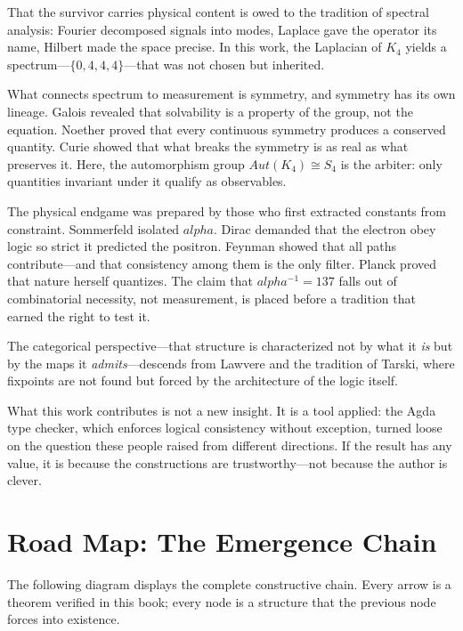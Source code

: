 \documentclass[11pt,a4paper]{book}
\def\alpha{alpha}%
\def\mathrm#1{#1}%
\begin{document}
That the survivor carries physical content is owed to the tradition of spectral analysis: Fourier decomposed signals into modes, Laplace gave the operator its name, Hilbert made the space precise. In this work, the Laplacian of $K_4$ yields a spectrum---$\{0,4,4,4\}$---that was not chosen but inherited.

What connects spectrum to measurement is symmetry, and symmetry has its own lineage. Galois revealed that solvability is a property of the group, not the equation. Noether proved that every continuous symmetry produces a conserved quantity. Curie showed that what breaks the symmetry is as real as what preserves it. Here, the automorphism group $\mathrm{Aut}(K_4) \cong S_4$ is the arbiter: only quantities invariant under it qualify as observables.

The physical endgame was prepared by those who first extracted constants from constraint. Sommerfeld isolated $\alpha$. Dirac demanded that the electron obey logic so strict it predicted the positron. Feynman showed that all paths contribute---and that consistency among them is the only filter. Planck proved that nature herself quantizes. The claim that $\alpha^{-1} = 137$ falls out of combinatorial necessity, not measurement, is placed before a tradition that earned the right to test it.

The categorical perspective---that structure is characterized not by what it \emph{is} but by the maps it \emph{admits}---descends from Lawvere and the tradition of Tarski, where fixpoints are not found but forced by the architecture of the logic itself.

What this work contributes is not a new insight. It is a tool applied: the Agda type checker, which enforces logical consistency without exception, turned loose on the question these people raised from different directions. If the result has any value, it is because the constructions are trustworthy---not because the author is clever.

\chapter*{Road Map: The Emergence Chain}

The following diagram displays the complete constructive chain. Every arrow is a theorem verified in this book; every node is a structure that the previous node forces into existence.
\end{document}
